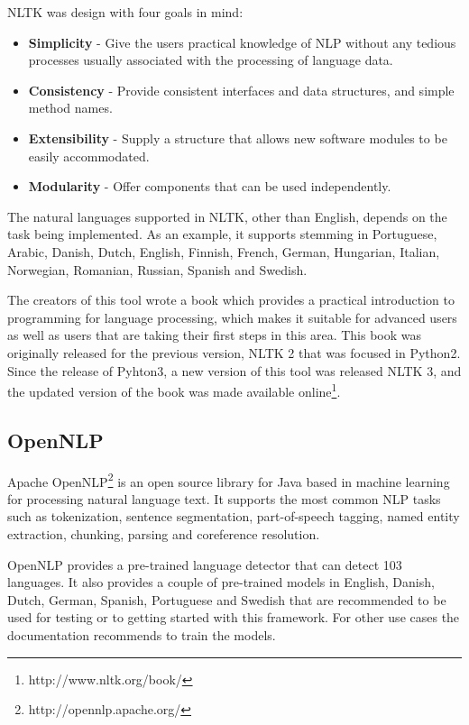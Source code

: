 NLTK was design with four goals\cite{bird2009natural} in mind:
\begin{itemize}
    \item \textbf{Simplicity} - Give the users practical knowledge of NLP without any tedious processes usually associated with the processing of language data.
    \item \textbf{Consistency} - Provide consistent interfaces and data structures, and simple method names.
    \item \textbf{Extensibility} - Supply a structure that allows new software modules to be easily accommodated.
    \item \textbf{Modularity} - Offer components that can be used independently.
\end{itemize}

The natural languages supported in NLTK, other than English, depends on the task being implemented.
As an example, it supports stemming in Portuguese, Arabic, Danish, Dutch, English, Finnish, French, German, Hungarian, Italian, Norwegian, Romanian, Russian, Spanish and Swedish.

The creators of this tool wrote a book\cite{bird2009natural} which provides a practical introduction to programming for language processing, which makes it suitable for advanced users as well as users that are taking their first steps in this area.
This book was originally released for the previous version, NLTK 2 that was focused in Python2.
Since the release of Pyhton3, a new version of this tool was released NLTK 3, and the updated version of the book was made available online\footnote{http://www.nltk.org/book/}.

\subsection{OpenNLP}

Apache OpenNLP\footnote{http://opennlp.apache.org/} is an open source library for Java based in machine learning for processing natural language text.
It supports the most common NLP tasks such as tokenization, sentence segmentation, part-of-speech tagging, named entity extraction, chunking, parsing and coreference resolution.

OpenNLP provides a pre-trained language detector that can detect 103 languages.
It also provides a couple of pre-trained models in English, Danish, Dutch, German, Spanish, Portuguese and Swedish that are recommended to be used for testing or to getting started with this framework.
For other use cases the documentation recommends to train the models.

